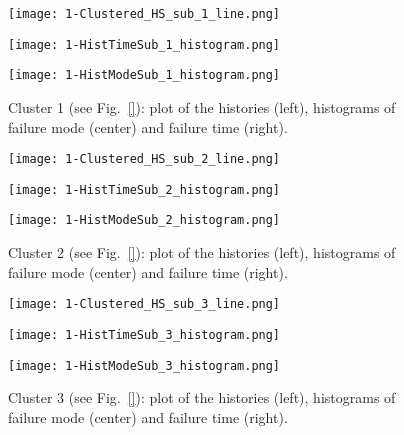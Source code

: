 \begin{figure}
  \centering
  \begin{minipage}{.33\textwidth}
  \centering
  \texttt{[image: 1-Clustered\_HS\_sub\_1\_line.png]}
  \end{minipage}\hfill
  \begin{minipage}{.33\textwidth}
  \centering
  \texttt{[image: 1-HistTimeSub\_1\_histogram.png]}
  \end{minipage}\hfill
  \begin{minipage}{.33\textwidth}
  \centering
  \texttt{[image: 1-HistModeSub\_1\_histogram.png]}
  \end{minipage}
  \caption{Cluster 1 (see Fig.~\ref{}): plot of the histories (left), histograms of failure mode 
           (center) and failure time (right).}
  \label{fig:pump_cluster_1_1}
\end{figure}

\begin{figure}
  \centering
  \begin{minipage}{.33\textwidth}
  \centering
  \texttt{[image: 1-Clustered\_HS\_sub\_2\_line.png]}
  \end{minipage}\hfill
  \begin{minipage}{.33\textwidth}
  \centering
  \texttt{[image: 1-HistTimeSub\_2\_histogram.png]}
  \end{minipage}\hfill
  \begin{minipage}{.33\textwidth}
  \centering
  \texttt{[image: 1-HistModeSub\_2\_histogram.png]}
  \end{minipage}
  \caption{Cluster 2 (see Fig.~\ref{}): plot of the histories (left), histograms of failure mode 
           (center) and failure time (right).}
  \label{fig:pump_cluster_1_2}
\end{figure}

\begin{figure}
  \centering
  \begin{minipage}{.33\textwidth}
  \centering
  \texttt{[image: 1-Clustered\_HS\_sub\_3\_line.png]}
  \end{minipage}\hfill
  \begin{minipage}{.33\textwidth}
  \centering
  \texttt{[image: 1-HistTimeSub\_3\_histogram.png]}
  \end{minipage}\hfill
  \begin{minipage}{.33\textwidth}
  \centering
  \texttt{[image: 1-HistModeSub\_3\_histogram.png]}
  \end{minipage}
  \caption{Cluster 3 (see Fig.~\ref{}): plot of the histories (left), histograms of failure mode 
           (center) and failure time (right).}
  \label{fig:pump_cluster_1_3}
\end{figure}

